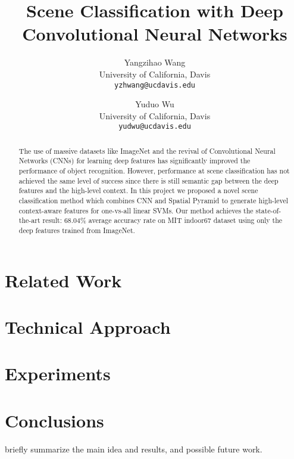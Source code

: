 \documentclass[10pt,twocolumn,letterpaper]{article}
\begin{document}
\title{Scene Classification with Deep Convolutional Neural Networks}

\author{Yangzihao Wang\\
University of California, Davis\\
{\tt\small yzhwang@ucdavis.edu}
\and
Yuduo Wu\\
University of California, Davis\\
{\tt\small yudwu@ucdavis.edu}
}

\maketitle

\begin{abstract}
The use of massive datasets like ImageNet and the revival of Convolutional
Neural Networks (CNNs) for learning deep features has significantly improved
the performance of object recognition. However, performance at scene
classification has not achieved the same level of success since there is still
semantic gap between the deep features and the high-level context.  In this
project we proposed a novel scene classification method which combines CNN and
Spatial Pyramid to generate high-level context-aware features for one-vs-all
linear SVMs. Our method achieves the state-of-the-art result: 68.04\% average
accuracy rate on MIT indoor67 dataset using only the deep features trained from
ImageNet.

\end{abstract}

\section{Related Work}
\label{sec:related}


\section{Technical Approach}
\label{sec:method}


\section{Experiments}
\label{sec:results}


\section{Conclusions}

briefly summarize the main idea and results, and possible future work.

{\small


}
\end{document}

